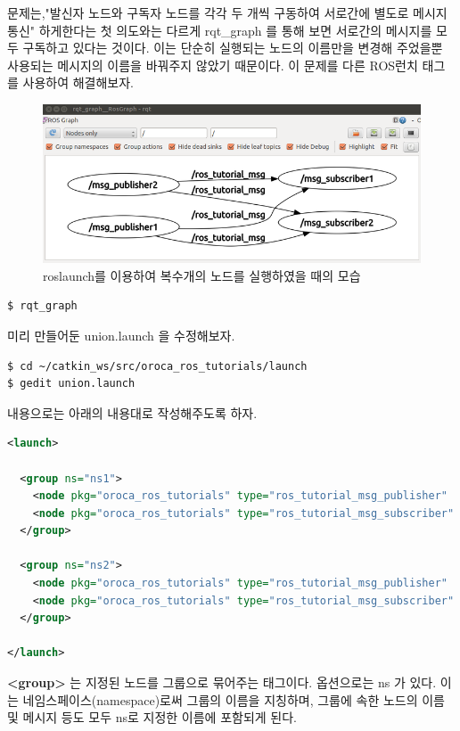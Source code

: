문제는,"발신자 노드와 구독자 노드를 각각 두 개씩 구동하여 서로간에 별도로 메시지 통신" 하게한다는 첫 의도와는 다르게 rqt\_graph 를 통해 보면 서로간의 메시지를 모두 구독하고 있다는 것이다. 이는 단순히 실행되는 노드의 이름만을 변경해 주었을뿐 사용되는 메시지의 이름을 바꿔주지 않았기 때문이다. 이 문제를 다른 ROS런치 태그를 사용하여 해결해보자.

\begin{figure}[h]
\centering\includegraphics[width=0.9\columnwidth]{pictures/chapter7/rqt_graph_oroca_ros_tutorials_union1.png}
\caption{roslaunch를 이용하여 복수개의 노드를 실행하였을 때의 모습}
\end{figure}

\begin{lstlisting}[language=ROS]
$ rqt_graph
\end{lstlisting}

미리 만들어둔 union.launch 을 수정해보자.

\begin{lstlisting}[language=ROS]
$ cd ~/catkin_ws/src/oroca_ros_tutorials/launch
$ gedit union.launch
\end{lstlisting}

내용으로는 아래의 내용대로 작성해주도록 하자.

\begin{lstlisting}[language=XML]
<launch>

  <group ns="ns1">
    <node pkg="oroca_ros_tutorials" type="ros_tutorial_msg_publisher"   name="msg_publisher"/>
    <node pkg="oroca_ros_tutorials" type="ros_tutorial_msg_subscriber"  name="msg_subscriber"/>
  </group>

  <group ns="ns2">
    <node pkg="oroca_ros_tutorials" type="ros_tutorial_msg_publisher"  name="msg_publisher"/>
    <node pkg="oroca_ros_tutorials" type="ros_tutorial_msg_subscriber"  name="msg_subscriber"/>
  </group>

</launch>
\end{lstlisting}

\textbf{\textless group\textgreater} 는 지정된 노드를 그룹으로 묶어주는 태그이다. 옵션으로는 ns 가 있다. 이는 네임스페이스(namespace)로써 그룹의 이름을 지칭하며, 그룹에 속한 노드의 이름 및 메시지 등도 모두 ns로 지정한 이름에 포함되게 된다.


